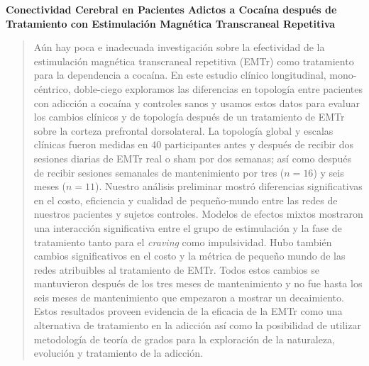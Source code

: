 \begin{center}
    \large\textbf{Conectividad Cerebral en Pacientes Adictos a Cocaína después de
     Tratamiento con Estimulación Magnética Transcraneal Repetitiva}
\end{center}
\begin{quotation}
    \noindent
    Aún hay poca e inadecuada investigación sobre la efectividad de la estimulación magnética transcraneal repetitiva (EMTr) como tratamiento para la dependencia a cocaína. En este estudio clínico longitudinal, mono-céntrico, doble-ciego exploramos las diferencias en topología entre pacientes con adicción a cocaína y controles sanos y usamos estos datos para evaluar los cambios clínicos y de topología después de un tratamiento de EMTr sobre la corteza prefrontal dorsolateral. La topología global y escalas clínicas fueron medidas en 40 participantes antes y después de recibir dos sesiones diarias de EMTr real o sham por dos semanas; así como después de recibir sesiones semanales de mantenimiento por tres ($n=16$) y seis meses ($n=11$). Nuestro análisis preliminar mostró diferencias significativas en el costo, eficiencia y cualidad de pequeño-mundo entre las redes de nuestros pacientes y sujetos controles. Modelos de efectos mixtos mostraron una interacción significativa entre el grupo de estimulación y la fase de tratamiento tanto para el \textit{craving} como impulsividad. Hubo también cambios significativos en el costo y la métrica de pequeño mundo de las redes atribuibles al tratamiento de EMTr. Todos estos cambios se mantuvieron después de los tres meses de mantenimiento y no fue hasta los seis meses de mantenimiento que empezaron a mostrar un decaimiento. Estos resultados proveen evidencia de la eficacia de la EMTr como una alternativa de tratamiento en la adicción así como la posibilidad de utilizar metodología de teoría de grados para la exploración de la naturaleza, evolución y tratamiento de la adicción.
\end{quotation}
\clearpage
